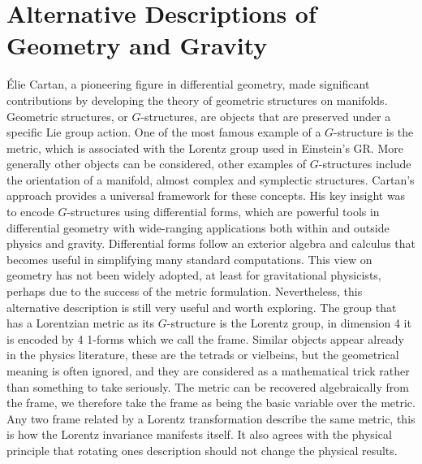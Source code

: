 \documentclass[10pt]{report}
\theoremstyle{definition}
\begin{document}
\section*{Alternative Descriptions of Geometry and Gravity}

\'Elie Cartan, a pioneering figure in differential geometry, made significant contributions by developing the theory of geometric structures on manifolds. Geometric structures, or $G$-structures, are objects that are preserved under a specific Lie group action. One of the most famous example of a $G$-structure is the metric, which is associated with the Lorentz group used in Einstein's GR. More generally other objects can be considered, other examples of $G$-structures include the orientation of a manifold, almost complex and symplectic structures. Cartan's approach provides a universal framework for these concepts. His key insight was to encode $G$-structures using differential forms, which are powerful tools in differential geometry with wide-ranging applications both within and outside physics and gravity. Differential forms follow an exterior algebra and calculus that becomes useful in simplifying many standard computations. This view on geometry has not been widely adopted, at least for gravitational physicists, perhaps due to the success of the metric formulation. Nevertheless, this alternative description is still very useful and worth exploring. The group that has a Lorentzian metric as its $G$-structure is the Lorentz group, in dimension 4 it is encoded by 4 1-forms which we call the frame. Similar objects appear already in the physics literature, these are the tetrads or vielbeins, but the geometrical meaning is often ignored, and they are considered as a mathematical trick rather than something to take seriously. The metric can be recovered algebraically from the frame, we therefore take the frame as being the basic variable over the metric. Any two frame related by a Lorentz transformation describe the same metric, this is how the Lorentz invariance manifests itself. It also agrees with the physical principle that rotating ones description should not change the physical results.
\end{document}
